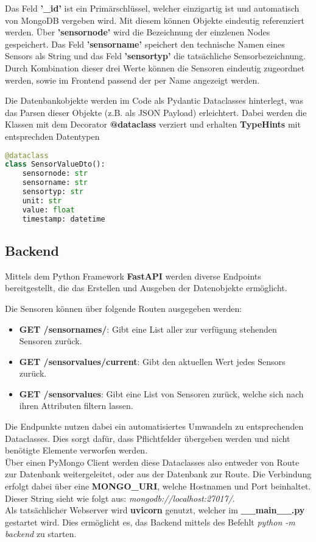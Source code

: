 Das Feld \textbf{'\_id'} ist ein Primärschlüssel, welcher einzigartig ist und automatisch von MongoDB vergeben wird. 
Mit diesem können Objekte eindeutig referenziert werden.
Über \textbf{'sensornode'} wird die Bezeichnung der einzlenen Nodes gespeichert.
Das Feld \textbf{'sensorname'} speichert den technische Namen eines Sensors als String und das Feld \textbf{'sensortyp'} die tatsächliche Sensorbezeichnung. 
Durch Kombination dieser drei Werte können die Sensoren eindeutig zugeordnet werden, sowie im Frontend passend der per Name angezeigt werden.

Die Datenbankobjekte werden im Code als Pydantic Dataclasses hinterlegt, was das Parsen dieser Objekte (z.B. als JSON Payload) erleichtert. 
Dabei werden die Klassen mit dem Decorator \textbf{@dataclass} verziert und erhalten \textbf{TypeHints} mit entsprechden Datentypen

\begin{lstlisting}[language=python,caption={Sensor Dataclass},captionpos=b,showstringspaces=false, basicstyle=\small,label={lst:dataclass}]
@dataclass
class SensorValueDto():
    sensornode: str
    sensorname: str
    sensortyp: str
    unit: str
    value: float
    timestamp: datetime
\end{lstlisting}

\subsection{Backend}
Mittels dem Python Framework \textbf{FastAPI} werden diverse Endpoints bereitgestellt, die das Erstellen und Ausgeben der Datenobjekte ermöglicht.

Die Sensoren können über folgende Routen ausgegeben werden:
\begin{itemize}
\item \textbf{GET /sensornames/}: Gibt eine List aller zur verfügung stehenden Sensoren zurück.
\item \textbf{GET /sensorvalues/current}: Gibt den aktuellen Wert jedes Sensors zurück.
\item \textbf{GET /sensorvalues}: Gibt eine List von Sensoren zurück, welche sich nach ihren Attributen filtern lassen.
\end{itemize}

Die Endpunkte nutzen dabei ein automatisiertes Umwandeln zu entsprechenden Dataclasses.
Dies sorgt dafür, dass Pflichtfelder übergeben werden und nicht benötigte Elemente verworfen werden.\\
Über einen PyMongo Client werden diese Dataclasses also entweder von Route zur Datenbank weitergeleitet, oder aus der Datenbank zur Route.
Die Verbindung erfolgt dabei über eine \textbf{MONGO\_URI}, welche Hostnamen und Port beinhaltet. Dieser String sieht wie folgt aus: \textit{mongodb://localhost:27017/}. \\
Als tatsächlicher Webserver wird \textbf{uvicorn} genutzt, welcher im \textbf{\_\_main\_\_.py} gestartet wird. Dies ermöglicht es, das Backend mittels des Befehlt \textit{python -m backend} zu starten.

